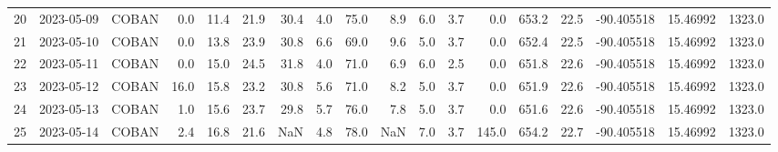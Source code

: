 \documentclass[12pt]{article}
\begin{document}
\begin{center}
\begin{tabular}{lllrrrrrrrrrrrrrrr}
20  & 2023-05-09 &  COBAN &     0.0 &  11.4 &   21.9 &  30.4 &      4.0 &     75.0 &        8.9 &  6.0 &         3.7 &         0.0 &      653.2 &        22.5 & -90.405518 &  15.46992 &   1323.0 \\
21  & 2023-05-10 &  COBAN &     0.0 &  13.8 &   23.9 &  30.8 &      6.6 &     69.0 &        9.6 &  5.0 &         3.7 &         0.0 &      652.4 &        22.5 & -90.405518 &  15.46992 &   1323.0 \\
22  & 2023-05-11 &  COBAN &     0.0 &  15.0 &   24.5 &  31.8 &      4.0 &     71.0 &        6.9 &  6.0 &         2.5 &         0.0 &      651.8 &        22.6 & -90.405518 &  15.46992 &   1323.0 \\
23  & 2023-05-12 &  COBAN &    16.0 &  15.8 &   23.2 &  30.8 &      5.6 &     71.0 &        8.2 &  5.0 &         3.7 &         0.0 &      651.9 &        22.6 & -90.405518 &  15.46992 &   1323.0 \\
24  & 2023-05-13 &  COBAN &     1.0 &  15.6 &   23.7 &  29.8 &      5.7 &     76.0 &        7.8 &  5.0 &         3.7 &         0.0 &      651.6 &        22.6 & -90.405518 &  15.46992 &   1323.0 \\
25  & 2023-05-14 &  COBAN &     2.4 &  16.8 &   21.6 &   NaN &      4.8 &     78.0 &        NaN &  7.0 &         3.7 &       145.0 &      654.2 &        22.7 & -90.405518 &  15.46992 &   1323.0 \\
\bottomrule
\end{tabular}

        
        \end{center}
        
\end{document}
